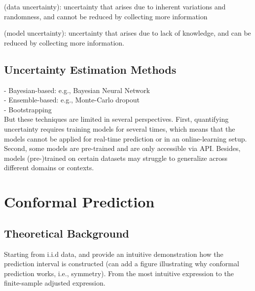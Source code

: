 \documentclass[a4paper,oneside,bibliography=totoc]{scrbook}
\begin{document}
\begin{description}[leftmargin=0cm]
\item[Aleatory Uncertainty]  (data uncertainty): uncertainty that arises due to inherent variations and randomness, and cannot be reduced by collecting more information 

\item[Epistemic Uncertainty] (model uncertainty): uncertainty that arises due to lack of knowledge, and can be reduced by collecting more information.
\end{description}

\subsection{Uncertainty Estimation Methods}
- Bayesian-based: e.g., Bayesian Neural Network \\
- Ensemble-based: e.g., Monte-Carlo dropout \\
- Bootstrapping \\
But these techniques are limited in several perspectives. First, quantifying uncertainty requires training models for several times, which means that the models cannot be applied for real-time prediction or in an online-learning setup. Second, some models are pre-trained and are only accessible via API. Besides, models (pre-)trained on certain datasets may struggle to generalize across different domains or contexts. 

\section{Conformal Prediction}
\label{sec: reviewCP}

\subsection{Theoretical Background}
Starting from i.i.d data, and provide an intuitive demonstration how the prediction interval is constructed (can add a figure illustrating why conformal prediction works, i.e., symmetry). From the most intuitive expression to the finite-sample adjusted expression. 
		
\end{document}
